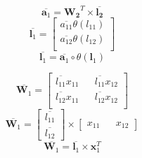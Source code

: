 \documentclass{article}
\begin{document}
\begin{equation}
    \overline{\bm{a}_{1}} = \bm{W_2}^T \times \overline{\bm{l_2}}
\end{equation}
\[
    \overline{\bm{l}_{1}} = \begin{bmatrix}
        \overline{a_{11}} \theta(l_{11}) \\
        \overline{a_{12}} \theta(l_{12}) \\
    \end{bmatrix}
\]
\begin{equation}
    \overline{\bm{l}_{1}} = \overline{\bm{a}_{1}} \circ \theta(\bm{l}_{1}) 
\end{equation}

\[
    \overline{\bm{W}_1} = \begin{bmatrix}
        \overline{l_{11}}x_{11} && \overline{l_{11}} x_{12} \\
        \overline{l_{12}}x_{11} && \overline{l_{12}} x_{12} \\
    \end{bmatrix}
\]
\[
    \overline{\bm{W}_1} = \begin{bmatrix}
        \overline{l_{11}} \\ \overline{l_{12}}
    \end{bmatrix} 
    \times
    \begin{bmatrix}
        x_{11} && x_{12} 
    \end{bmatrix}
\]
\begin{equation}
     \overline{\bm{W}_1} = \overline{\bm{l}_{1}} \times \bm{x}_1^T
\end{equation}

\end{document}
